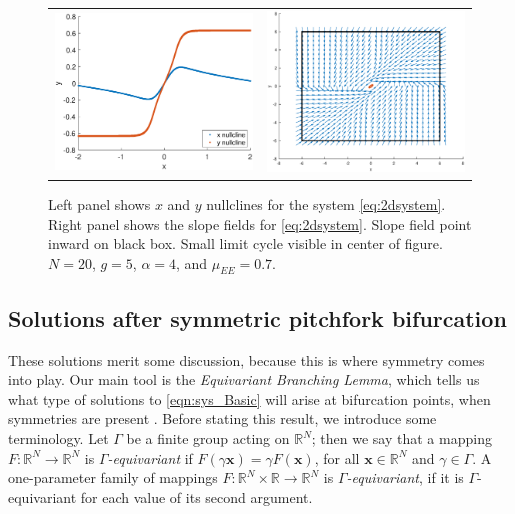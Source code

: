 \documentclass[11pt,reqno]{amsart}
\newcommand{\xvec}{\mathbf{x}}
\begin{document}
\begin{figure}
    \centering
    \begin{tabular}{cc}
    \includegraphics[width=8cm]{images/nullclines.eps} &
    \includegraphics[width=8cm]{images/trappingregion.eps}
    \end{tabular}
    \caption{Left panel shows $x$ and $y$ nullclines for the system \cref{eq:2dsystem}. Right panel shows the slope fields for \cref{eq:2dsystem}. Slope field point inward on black box. Small limit cycle visible in center of figure. $N = 20$, $g = 5$, $\alpha = 4$, and $\mu_{EE} = 0.7$.}
    \label{fig:nullclines}
\end{figure}


\subsection{Solutions after symmetric pitchfork bifurcation}
These solutions merit some discussion, because this is where symmetry comes into play.  Our main tool is the \emph{Equivariant Branching Lemma}, which tells us what type of solutions to \cref{eqn:sys_Basic} will arise at bifurcation points, when symmetries are present \cites{MR631456,GSS88Vol2,HoyleRebeccaB2006Pf:a}. Before stating this result, we introduce some terminology. Let $\Gamma$ be a finite group acting on $\mathbb{R}^N$; then we say that a mapping $F: \mathbb{R}^N  \rightarrow \mathbb{R}^N$ is \textit{$\Gamma$-equivariant} if $F(\gamma \xvec) = \gamma F(\xvec)$, for all $\xvec \in \mathbb{R}^N$ and $\gamma \in \Gamma$.  A one-parameter family of mappings $F: \mathbb{R}^N \times \mathbb{R}  \rightarrow \mathbb{R}^N$ is \textit{$\Gamma$-equivariant}, if it is $\Gamma$-equivariant for each value of its second argument.
\end{document}
